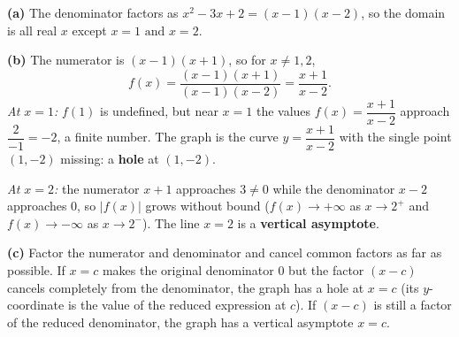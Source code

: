 \textbf{(a)} The denominator factors as $x^2-3x+2=(x-1)(x-2)$, so the domain is all real $x$ except $\boxed{x=1\text{ and }x=2}$.

\textbf{(b)} The numerator is $(x-1)(x+1)$, so for $x\ne1,2$,
\[
f(x)=\dfrac{(x-1)(x+1)}{(x-1)(x-2)}=\dfrac{x+1}{x-2}.
\]
\emph{At $x=1$:} $f(1)$ is undefined, but near $x=1$ the values $f(x)=\dfrac{x+1}{x-2}$ approach $\dfrac{2}{-1}=-2$, a finite number. The graph is the curve $y=\dfrac{x+1}{x-2}$ with the single point $(1,-2)$ missing: a \textbf{hole} at $\boxed{(1,-2)}$.

\emph{At $x=2$:} the numerator $x+1$ approaches $3\ne0$ while the denominator $x-2$ approaches $0$, so $|f(x)|$ grows without bound ($f(x)\to+\infty$ as $x\to2^+$ and $f(x)\to-\infty$ as $x\to2^-$). The line $\boxed{x=2}$ is a \textbf{vertical asymptote}.

\textbf{(c)} Factor the numerator and denominator and cancel common factors as far as possible. If $x=c$ makes the original denominator $0$ but the factor $(x-c)$ cancels completely from the denominator, the graph has a hole at $x=c$ (its $y$-coordinate is the value of the reduced expression at $c$). If $(x-c)$ is still a factor of the reduced denominator, the graph has a vertical asymptote $x=c$.
